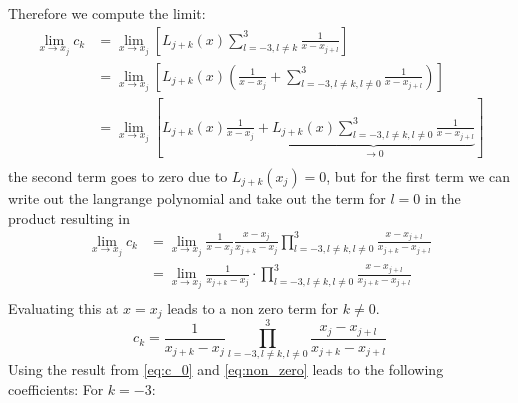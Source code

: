 Therefore we compute the limit:
\begin{equation}
	\begin{aligned}
		\lim_{x \rightarrow x_j} c_k & = \lim_{x \rightarrow x_j} \left [ L_{j+k}(x)  \sum_{l=-3, l \neq k}^3 \frac{1}{x - x_{j+l}} \right ]                                                                         \\
		                             & = \lim_{x \rightarrow x_j} \left [ L_{j+k}(x) \left (  \frac{1}{x - x_j} + \sum_{l=-3, l \neq k, l \neq 0}^3 \frac{1}{x - x_{j+l}} \right ) \right ]                          \\
		                             & = \lim_{x \rightarrow x_j} \left [ L_{j+k}(x)  \frac{1}{x - x_j}  + \underbrace{L_{j+k}(x) \sum_{l=-3, l \neq k, l \neq 0}^3 \frac{1}{x - x_{j+l}} }_{\rightarrow 0} \right ] \\
	\end{aligned}
	\label{eq:lim_c_k}
\end{equation}
the second term goes to zero due to $L_{j+k}(x_j) = 0$, but for the first term we can write out the langrange polynomial and take out the term for $l=0$ in the product resulting in
\begin{equation}
	\begin{aligned}
		\lim_{x \rightarrow x_j} c_k & =  \lim_{x \rightarrow x_j} \frac{1}{x - x_j} \frac{x - x_j}{x_{j+k} - x_j} \prod_{l=-3, l \neq k, l \neq 0}^3 \frac{x - x_{j+l}}{x_{j+k} - x_{j+l}} \\
		                             & =  \lim_{x \rightarrow x_j} \frac{1}{x_{j+k} - x_j} \cdot \prod_{l=-3, l \neq k, l \neq 0}^3 \frac{x - x_{j+l}}{x_{j+k} - x_{j+l}}                   \\
		\label{eq:yep}
	\end{aligned}
\end{equation}
Evaluating this at $x = x_j$ leads to a non zero term for $k \neq 0$.
\begin{equation}
	c_k = \frac{1}{x_{j+k} - x_j} \prod_{l=-3, l \neq k, l \neq 0}^3 \frac{x_j - x_{j+l}}{x_{j+k} - x_{j+l}}
	\label{eq:non_zero}
\end{equation}
Using the result from \eqref{eq:c_0} and \eqref{eq:non_zero} leads to the following coefficients:\newline
For $k=-3$:

